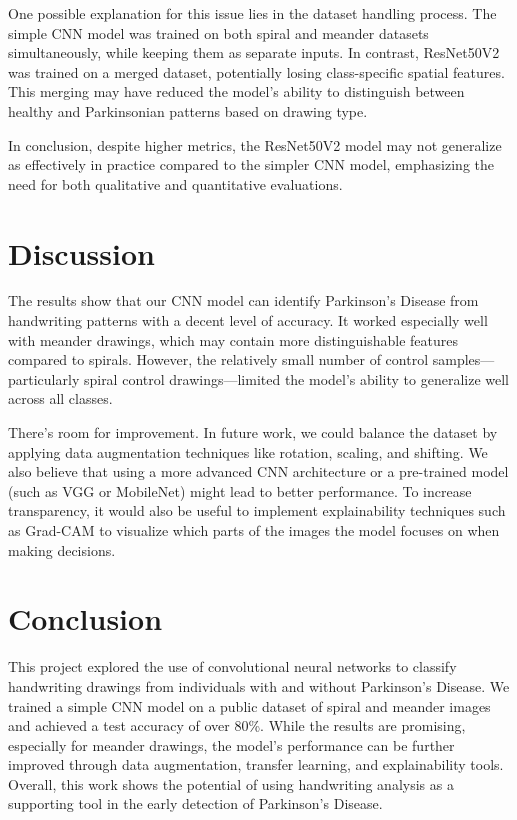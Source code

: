 \documentclass[twocolumn]{article}
\begin{document}
One possible explanation for this issue lies in the dataset handling process. The simple CNN model was trained on both spiral and meander datasets simultaneously, while keeping them as separate inputs. In contrast, ResNet50V2 was trained on a merged dataset, potentially losing class-specific spatial features. This merging may have reduced the model’s ability to distinguish between healthy and Parkinsonian patterns based on drawing type.

\noindent In conclusion, despite higher metrics, the ResNet50V2 model may not generalize as effectively in practice compared to the simpler CNN model, emphasizing the need for both qualitative and quantitative evaluations.


\section{Discussion}
The results show that our CNN model can identify Parkinson’s Disease from handwriting patterns with a decent level of accuracy. It worked especially well with meander drawings, which may contain more distinguishable features compared to spirals. However, the relatively small number of control samples—particularly spiral control drawings—limited the model’s ability to generalize well across all classes.

There’s room for improvement. In future work, we could balance the dataset by applying data augmentation techniques like rotation, scaling, and shifting. We also believe that using a more advanced CNN architecture or a pre-trained model (such as VGG or MobileNet) might lead to better performance. To increase transparency, it would also be useful to implement explainability techniques such as Grad-CAM to visualize which parts of the images the model focuses on when making decisions.

\section{Conclusion}
This project explored the use of convolutional neural networks to classify handwriting drawings from individuals with and without Parkinson’s Disease. We trained a simple CNN model on a public dataset of spiral and meander images and achieved a test accuracy of over 80\%. While the results are promising, especially for meander drawings, the model’s performance can be further improved through data augmentation, transfer learning, and explainability tools. Overall, this work shows the potential of using handwriting analysis as a supporting tool in the early detection of Parkinson’s Disease.
\end{document}
